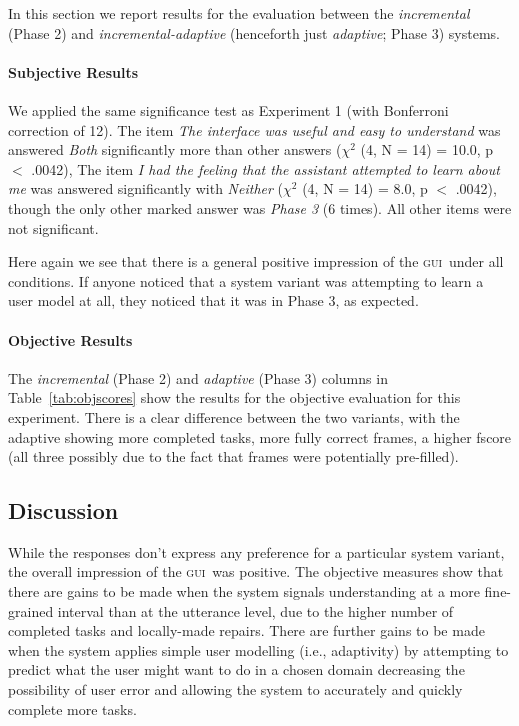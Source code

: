 \documentclass[11pt]{article}
\newcommand{\ui}[0]{\textsc{gui}}
\begin{document}
In this section we report results for the evaluation between the \emph{incremental} (Phase 2) and \emph{incremental-adaptive} (henceforth just \emph{adaptive}; Phase 3) systems. 

\paragraph{Subjective Results}  We applied the same significance test as Experiment 1 (with Bonferroni correction of 12). The item \emph{The interface was useful and easy to understand} was answered \emph{Both} significantly more than other answers  ($ \chi^2 $ (4, N = 14) = 10.0, p $<$ .0042), The item \emph{I had the feeling that the assistant attempted to learn about me} was answered significantly with \emph{Neither} ($ \chi^2 $ (4, N = 14) = 8.0, p $<$ .0042), though the only other marked answer was \emph{Phase 3} (6 times). All other items were not significant.

Here again we see that there is a general positive impression of the \ui\ under all conditions. If anyone noticed that a system variant was attempting to learn a user model at all, they noticed that it was in Phase 3, as expected. 

\paragraph{Objective Results} The \emph{incremental} (Phase 2) and \emph{adaptive} (Phase 3) columns in Table~\ref{tab:objscores} show the results for the objective evaluation for this experiment. There is a clear difference between the two variants, with the adaptive showing more completed tasks, more fully correct frames, a higher fscore (all three possibly due to the fact that frames were potentially pre-filled). 

\subsection{Discussion}

While the responses don't express any preference for a particular system variant, the overall impression of the \ui\ was positive. The objective measures show that there are gains to be made when the system signals understanding at a more fine-grained interval than at the utterance level, due to the higher number of completed tasks and locally-made repairs. There are further gains to be made when the system applies simple user modelling (i.e., adaptivity) by attempting to predict what the user might want to do in a chosen domain decreasing the possibility of user error and allowing the system to accurately and quickly complete more tasks. 
\end{document}
